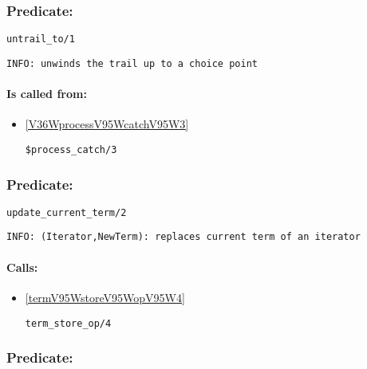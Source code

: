 \subsubsection{Predicate:} \label{untrailV95WtoV95W1}

\begin{verbatim}
untrail_to/1
\end{verbatim}

{\small \begin{verbatim}
INFO: unwinds the trail up to a choice point

\end{verbatim}}
\paragraph{Is called from:} 
\begin{itemize}
\item \ref{V36WprocessV95WcatchV95W3} 
\begin{verbatim}
$process_catch/3
\end{verbatim}

\end{itemize}

\subsubsection{Predicate:} \label{updateV95WcurrentV95WtermV95W2}

\begin{verbatim}
update_current_term/2
\end{verbatim}

{\small \begin{verbatim}
INFO: (Iterator,NewTerm): replaces current term of an iterator

\end{verbatim}}
\paragraph{Calls:} 
\begin{itemize}
\item \ref{termV95WstoreV95WopV95W4} 
\begin{verbatim}
term_store_op/4
\end{verbatim}

\end{itemize}

\subsubsection{Predicate:} \label{userV95WerrorV95W2}

